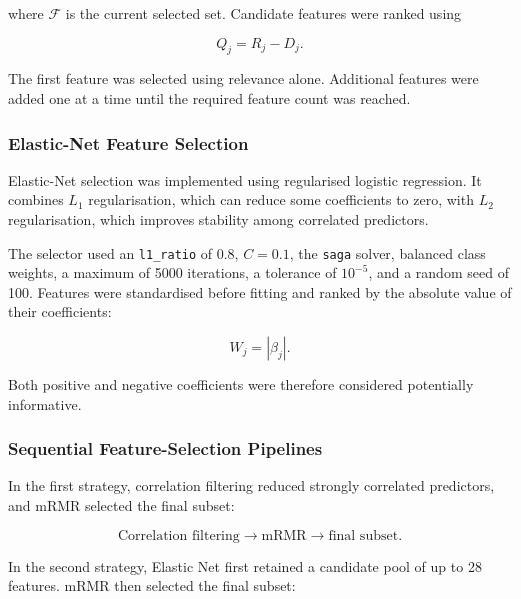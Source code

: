 \documentclass[12pt,twocolumn]{article}
\begin{document}
where \(\mathcal{F}\) is the current selected set. Candidate features
were ranked using

\begin{equation}
Q_j=R_j-D_j.
\label{eq:mrmr_score}
\end{equation}

The first feature was selected using relevance alone. Additional
features were added one at a time until the required feature count was
reached.

\subsubsection{Elastic-Net Feature Selection}
\label{subsubsec:elasticnet_selection}

Elastic-Net selection was implemented using regularised logistic
regression. It combines \(L_1\) regularisation, which can reduce some
coefficients to zero, with \(L_2\) regularisation, which improves
stability among correlated predictors.

The selector used an \texttt{l1\_ratio} of 0.8, \(C=0.1\), the
\texttt{saga} solver, balanced class weights, a maximum of 5000
iterations, a tolerance of \(10^{-5}\), and a random seed of 100.
Features were standardised before fitting and ranked by the absolute
value of their coefficients:

\begin{equation}
W_j=|\beta_j|.
\label{eq:elasticnet_feature_weight}
\end{equation}

Both positive and negative coefficients were therefore considered
potentially informative.

\subsubsection{Sequential Feature-Selection Pipelines}
\label{subsubsec:sequential_fs_pipelines}

In the first strategy, correlation filtering reduced strongly
correlated predictors, and mRMR selected the final subset:

\begin{equation}
\text{Correlation filtering}
\longrightarrow
\text{mRMR}
\longrightarrow
\text{final subset}.
\label{eq:corr_mrmr_pipeline}
\end{equation}

In the second strategy, Elastic Net first retained a candidate pool of
up to 28 features. mRMR then selected the final subset:
\end{document}
